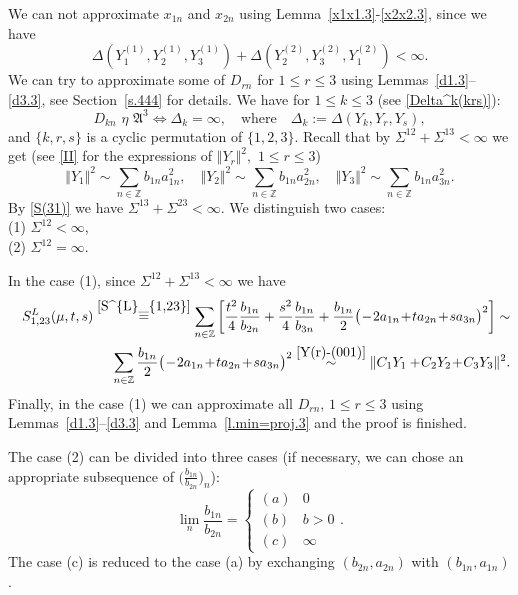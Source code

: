 \documentclass[preprint,12pt]{elsarticle}
\numberwithin{equation}{section}
\begin{document}
We can not approximate  $x_{1n}$ and $x_{2n}$ using  Lemma~\ref{x1x1.3}-\ref{x2x2.3}, since we have
$$
\Delta(Y_1^{(1)}, Y_2^{(1)},Y_3^{(1)})+\Delta(Y_2^{(2)}, Y_3^{(2)},Y_1^{(2)})<\infty.
$$
We can try to approximate some of $D_{rn}$ for $1\leq r\leq 3$ using Lemmas~\ref{d1.3}--\ref{d3.3}, see Section~\ref{s.444} for details. 
We have for $1\leq k\leq 3$ (see \eqref{Delta^k(krs)}):
%
\begin{equation*}
D_{kn}\,\,\eta\,\,{\mathfrak A}^3\Leftrightarrow \Delta_k=\infty,\quad\text{where}\quad 
\Delta_k:=\Delta(Y_k,Y_r,Y_s),
\end{equation*}
and $\{k,r,s\}$ is a cyclic permutation of $\{1,2,3\}$.
Recall that by $\Sigma^{12}+\Sigma^{13}<\infty$ we get  (see \eqref{II} for the expressions of $\Vert Y_r \Vert^2,\,\,1\leq r\leq 3$)
\begin{equation}
\label{Y(r)-(001)}
\Vert Y_1 \Vert^2\sim
\sum_{n\in \mathbb Z}b_{1n}a_{1n}^2,\quad
\Vert Y_2 \Vert^2\sim
\sum_{n\in \mathbb Z}b_{1n}a_{2n}^2,\quad
\Vert Y_3\Vert^2\sim
\sum_{n\in \mathbb Z}b_{1n}a_{3n}^2. 
\end{equation}
By \eqref{S(31)}
we have $
\Sigma^{13}+\Sigma^{23}<\infty$. We distinguish two cases:\\
(1) $\Sigma^{12}<\infty$,\\
(2) $\Sigma^{12}=\infty$.

In the case (1), since $
\Sigma^{12}+\Sigma^{13}<\infty$ we have
\begin{eqnarray*}
&&
S^{L}_{1,23}(\mu,t,s)\stackrel{\eqref{S^{L}_{1,23}} }{=}\sum_{n\in{\mathbb
Z}}\left[\frac{t^2}{4}\frac{b_{1n}}{b_{2n}}+\frac{s^2}{4}\frac{b_{1n}}{b_{3n}}+
\frac{b_{1n}}{2}\big(\!-\!2a_{1n}\!+\!ta_{2n}\!+\!sa_{3n}\big)^2\right]\sim\\
&&
\sum_{n\in{\mathbb
Z}}
\frac{b_{1n}}{2}\big(\!-\!2a_{1n}\!+\!ta_{2n}\!+\!sa_{3n}\big)^2\stackrel{\eqref{Y(r)-(001)}}{\sim} 
\Vert C_1Y_1+\!C_2Y_2\!+\!C_3Y_3\Vert^2.
\end{eqnarray*}
Finally, in the case (1) we can approximate all $D_{rn},\,1\leq r\leq 3$  using Lemmas~\ref{d1.3}--\ref{d3.3} and 
Lemma~\ref{l.min=proj.3}
and the proof is finished.
%

The case (2) 
can be divided into three
cases (if necessary, we can chose an appropriate subsequence of $\Big(\frac{b_{1n}}{b_{2n}}\Big)_n$\big):
\begin{equation}
\label{2.(001)}
\lim_n\frac{b_{1n}}{b_{2n}}=\!\left\{\begin{array}{cl}
 (a)&0\\
 (b)&b>0\\
 (c)&\infty
\end{array}\right.. 
\end{equation}
The case (c) is reduced to the case (a) by exchanging $(b_{2n},a_{2n})$ with $(b_{1n},a_{1n})$.
\end{document}
